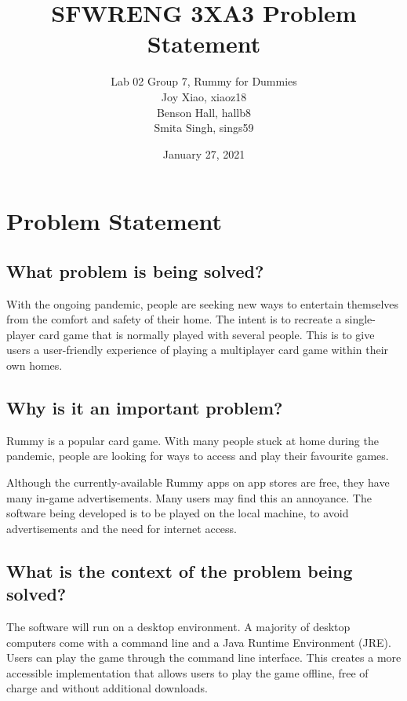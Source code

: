 \documentclass[12pt]{article}
\title{SFWRENG 3XA3 Problem Statement}
\author{
	Lab 02 Group 7, Rummy for Dummies
		\\ Joy Xiao, xiaoz18
        \\ Benson Hall, hallb8
        \\ Smita Singh, sings59
}
\date{January 27, 2021}
\begin{document}
\maketitle

\section{Problem Statement}
\subsection*{What problem is being solved?}
With the ongoing pandemic, people are seeking new ways to entertain themselves from the comfort and safety of their home. The intent is to recreate a single-player card game that is normally played with several people. This is to give users a user-friendly experience of playing a multiplayer card game within their own homes. 

\subsection*{Why is it an important problem?}
Rummy is a popular card game. With many people stuck at home during the pandemic, people are looking for ways to access and play their favourite games. 

Although the currently-available Rummy apps on app stores are free, they have many in-game advertisements. Many users may find this an annoyance. The software being developed is to be played on the local machine, to avoid advertisements and the need for internet access.



\subsection*{What is the context of the problem being solved?}
The software will run on a desktop environment. A majority of desktop computers come with a command line and a Java Runtime Environment (JRE). Users can play the game through the command line interface. This creates a more accessible implementation that allows users to play the game offline, free of charge and without additional downloads.
\end{document}

